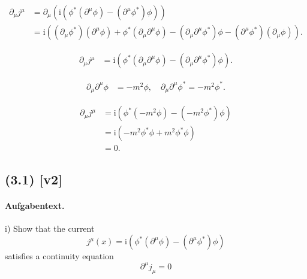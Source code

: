 \documentclass[11pt,a4paper]{article}
\begin{document}
\begin{align*}
\partial_\mu j^\mu &= \partial_\mu \left( \mathrm{i} \left( \phi^* \left( \partial^\mu \phi \right) - \left( \partial^\mu \phi^* \right) \phi \right) \right) \\
&= \mathrm{i} \left( \left( \partial_\mu \phi^* \right) \left( \partial^\mu \phi \right) + \phi^* \left( \partial_\mu \partial^\mu \phi \right) - \left( \partial_\mu \partial^\mu \phi^* \right) \phi - \left( \partial^\mu \phi^* \right) \left( \partial_\mu \phi \right) \right).
\end{align*}


\begin{align*}
\partial_\mu j^\mu &= \mathrm{i} \left( \phi^* \left( \partial_\mu \partial^\mu \phi \right) - \left( \partial_\mu \partial^\mu \phi^* \right) \phi \right).
\end{align*}


\begin{align*}
\partial_\mu \partial^\mu \phi &= -m^2 \phi, \quad \partial_\mu \partial^\mu \phi^* = -m^2 \phi^*.
\end{align*}


\begin{align*}
\partial_\mu j^\mu &= \mathrm{i} \left( \phi^* (-m^2 \phi) - (-m^2 \phi^*) \phi \right) \\
&= \mathrm{i} \left( -m^2 \phi^* \phi + m^2 \phi^* \phi \right) \\
&= 0.
\end{align*}



\subsection*{(3.1) [v2]}
\paragraph{Aufgabentext.}
i) Show that the current
$$
j^\mu(x)=\mathrm{i}\left(\phi^*\left(\partial^\mu \phi\right)-\left(\partial^\mu \phi^*\right) \phi\right)
$$
satisfies a continuity equation
$$
\partial^\mu j_\mu=0
$$
\end{document}
